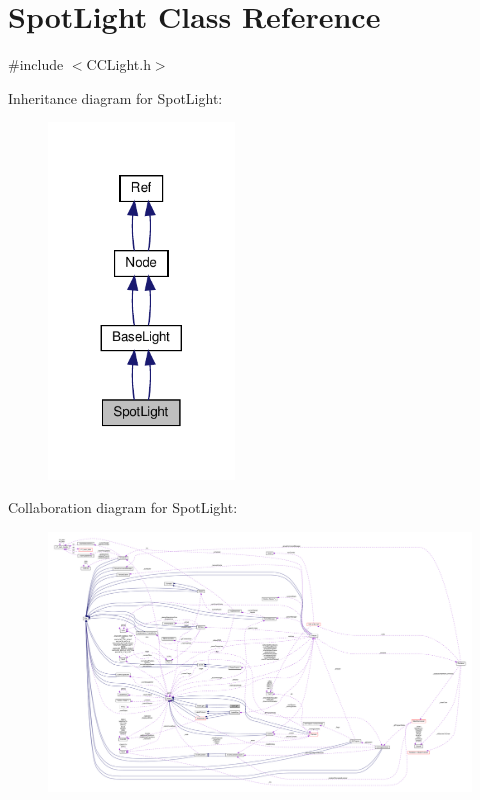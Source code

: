 \hypertarget{classSpotLight}{}\section{Spot\+Light Class Reference}
\label{classSpotLight}


{\ttfamily \#include $<$C\+C\+Light.\+h$>$}



Inheritance diagram for Spot\+Light\+:
\nopagebreak
\begin{figure}[H]
\begin{center}
\leavevmode
\includegraphics[width=140pt]{classSpotLight__inherit__graph}
\end{center}
\end{figure}


Collaboration diagram for Spot\+Light\+:
\nopagebreak
\begin{figure}[H]
\begin{center}
\leavevmode
\includegraphics[width=350pt]{classSpotLight__coll__graph}
\end{center}
\end{figure}
